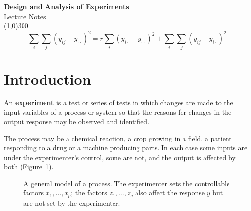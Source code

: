 \documentclass[11pt,a4paper]{article}
\numberwithin{equation}{section}
\theoremstyle{definition}
\begin{document}
\begin{titlepage}
\thispagestyle{empty}
\begin{center}
\vspace*{3cm}
{\Huge\bfseries Design and Analysis of Experiments}\\[1.2cm]
{\large Lecture Notes}\\[2.5cm]
\line(1,0){300}\\[1.5cm]
$$\sum_{i}\sum_{j}(y_{ij}-\bar y_{\cdot\cdot})^2 = r\sum_{i}(\bar y_{i\cdot}-\bar y_{\cdot\cdot})^2 + \sum_{i}\sum_{j}(y_{ij}-\bar y_{i\cdot})^2$$
\end{center}
\end{titlepage}

\tableofcontents
\thispagestyle{empty}
\clearpage
\setcounter{page}{1}

\section{Introduction}
An \textbf{experiment} is a test or series of tests in which changes are made to the input variables of a process or system so that the
reasons for changes in the output response may be observed and identified.

The process may be a chemical reaction, a crop growing in a field, a patient responding to a drug or a machine producing parts. In each case
some inputs are under the experimenter's control, some are not, and the output is affected by both (Figure~\ref{fig:process}).

\begin{figure}[H]
\centering
{}
\caption{A general model of a process. The experimenter sets the controllable factors $x_1,\dots,x_p$; the factors $z_1,\dots,z_q$
also affect the response $y$ but are not set by the experimenter.}
\label{fig:process}
\end{figure}
\end{document}
